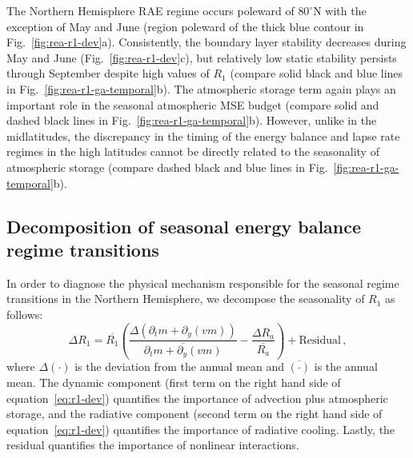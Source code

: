 \documentclass{ametsocV5}
\begin{document}
    The Northern Hemisphere RAE regime occurs poleward of $80^\circ$N with the exception of May and June (region poleward of the thick blue contour in Fig.~\ref{fig:rea-r1-dev}a). Consistently, the boundary layer stability decreases during May and June (Fig.~\ref{fig:rea-r1-dev}c), but relatively low static stability persists through September despite high values of $R_1$ (compare solid black and blue lines in Fig.~\ref{fig:rea-r1-ga-temporal}b). The atmospheric storage term again plays an important role in the seasonal atmospheric MSE budget (compare solid and dashed black lines in Fig.~\ref{fig:rea-r1-ga-temporal}b). However, unlike in the midlatitudes, the discrepancy in the timing of the energy balance and lapse rate regimes in the high latitudes cannot be directly related to the seasonality of atmospheric storage (compare dashed black and blue lines in Fig.~\ref{fig:rea-r1-ga-temporal}b).

    \subsection{Decomposition of seasonal energy balance regime transitions}
    In order to diagnose the physical mechanism responsible for the seasonal regime transitions in the Northern Hemisphere, we decompose the seasonality of $R_1$ as follows:
    \begin{equation}\label{eq:r1-dev}
      \Delta R_1 = \overline{R_1}\left( \frac{\Delta(\partial_t m + \partial_y (vm))}{\overline{\partial_t m + \partial_y (vm)}}  - \frac{\Delta R_a }{\overline{R_a}}\right) + \mathrm{Residual} \, ,
    \end{equation}
    where $\Delta(\cdot)$ is the deviation from the annual mean and $\overline{(\cdot)}$ is the annual mean. The dynamic component (first term on the right hand side of equation~\ref{eq:r1-dev}) quantifies the importance of advection plus atmospheric storage, and the radiative component (second term on the right hand side of equation~\ref{eq:r1-dev}) quantifies the importance of radiative cooling. Lastly, the residual quantifies the importance of nonlinear interactions.
\end{document}
